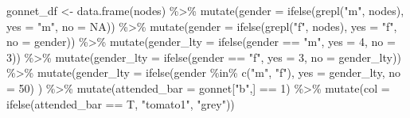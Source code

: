 \documentclass[12pt]{article}
\newenvironment{Shaded}{\begin{snugshade}}{\end{snugshade}}
\newcommand{\AttributeTok}[1]{\textcolor[rgb]{0.77,0.63,0.00}{#1}}
\newcommand{\ConstantTok}[1]{\textcolor[rgb]{0.00,0.00,0.00}{#1}}
\newcommand{\DecValTok}[1]{\textcolor[rgb]{0.00,0.00,0.81}{#1}}
\newcommand{\FunctionTok}[1]{\textcolor[rgb]{0.00,0.00,0.00}{#1}}
\newcommand{\NormalTok}[1]{#1}
\newcommand{\OtherTok}[1]{\textcolor[rgb]{0.56,0.35,0.01}{#1}}
\newcommand{\SpecialCharTok}[1]{\textcolor[rgb]{0.00,0.00,0.00}{#1}}
\newcommand{\StringTok}[1]{\textcolor[rgb]{0.31,0.60,0.02}{#1}}
\begin{document}
\begin{Shaded}
\begin{Highlighting}[]
\NormalTok{gonnet\_df }\OtherTok{\textless{}{-}} \FunctionTok{data.frame}\NormalTok{(nodes) }\SpecialCharTok{\%\textgreater{}\%}
  \FunctionTok{mutate}\NormalTok{(}\AttributeTok{gender =} \FunctionTok{ifelse}\NormalTok{(}\FunctionTok{grepl}\NormalTok{(}\StringTok{"m"}\NormalTok{, nodes), }\AttributeTok{yes =} \StringTok{"m"}\NormalTok{, }\AttributeTok{no =} \ConstantTok{NA}\NormalTok{)) }\SpecialCharTok{\%\textgreater{}\%}
  \FunctionTok{mutate}\NormalTok{(}\AttributeTok{gender =} \FunctionTok{ifelse}\NormalTok{(}\FunctionTok{grepl}\NormalTok{(}\StringTok{"f"}\NormalTok{, nodes), }\AttributeTok{yes =} \StringTok{"f"}\NormalTok{, }\AttributeTok{no =}\NormalTok{ gender)) }\SpecialCharTok{\%\textgreater{}\%}
  \FunctionTok{mutate}\NormalTok{(}\AttributeTok{gender\_lty =} \FunctionTok{ifelse}\NormalTok{(gender }\SpecialCharTok{==} \StringTok{"m"}\NormalTok{, }\AttributeTok{yes =} \DecValTok{4}\NormalTok{, }\AttributeTok{no =} \DecValTok{3}\NormalTok{)) }\SpecialCharTok{\%\textgreater{}\%}
  \FunctionTok{mutate}\NormalTok{(}\AttributeTok{gender\_lty =} \FunctionTok{ifelse}\NormalTok{(gender }\SpecialCharTok{==} \StringTok{"f"}\NormalTok{, }\AttributeTok{yes =} \DecValTok{3}\NormalTok{, }\AttributeTok{no =}\NormalTok{ gender\_lty)) }\SpecialCharTok{\%\textgreater{}\%}
  \FunctionTok{mutate}\NormalTok{(}\AttributeTok{gender\_lty =} \FunctionTok{ifelse}\NormalTok{(gender }\SpecialCharTok{\%in\%} \FunctionTok{c}\NormalTok{(}\StringTok{"m"}\NormalTok{, }\StringTok{"f"}\NormalTok{), }\AttributeTok{yes =}\NormalTok{ gender\_lty, }\AttributeTok{no =} \DecValTok{50}\NormalTok{)}
\NormalTok{         ) }\SpecialCharTok{\%\textgreater{}\%}
  \FunctionTok{mutate}\NormalTok{(}\AttributeTok{attended\_bar =}\NormalTok{ gonnet[}\StringTok{"b"}\NormalTok{,] }\SpecialCharTok{==} \DecValTok{1}\NormalTok{) }\SpecialCharTok{\%\textgreater{}\%}
  \FunctionTok{mutate}\NormalTok{(}\AttributeTok{col =} \FunctionTok{ifelse}\NormalTok{(attended\_bar }\SpecialCharTok{==}\NormalTok{ T, }\StringTok{"tomato1"}\NormalTok{, }\StringTok{"grey"}\NormalTok{))}



\end{Highlighting}
\end{Shaded}
\end{document}
